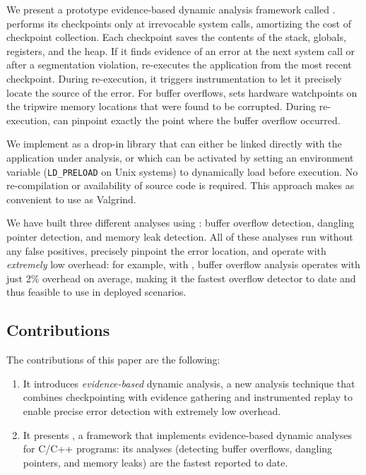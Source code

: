 We present a prototype evidence-based dynamic analysis framework called \doubletake{}. \doubletake{} performs its checkpoints only at
irrevocable system calls, amortizing the cost of checkpoint
collection. Each checkpoint saves the contents of the stack,
globals, registers, and the heap. If it finds evidence of an error at
the next system call or after a segmentation violation, \doubletake{}
re-executes the application from the most recent checkpoint. During
re-execution, it triggers instrumentation to let it precisely locate
the source of the error. For buffer overflows, \doubletake{} sets hardware watchpoints on the tripwire
memory locations that were found to be corrupted. During re-execution,
\doubletake{} can pinpoint exactly the point where the buffer overflow
occurred.

We implement \doubletake{} as a drop-in library that can either be
linked directly with the application under analysis, or which can be
activated by setting an environment variable (\texttt{LD\_PRELOAD} on
Unix systems) to dynamically load \doubletake{} before execution. No
re-compilation or availability of source code is required. This
approach makes \doubletake{} as convenient to use as Valgrind.

We have built three different analyses using \doubletake{}: buffer
overflow detection, dangling pointer detection, and memory leak
detection. All of these analyses run without any false positives,
precisely pinpoint the error location, and operate
with \emph{extremely} low overhead: for example, with \doubletake{},
buffer overflow analysis operates with just 2\% overhead on average,
making it the fastest overflow detector to date and thus feasible to
use in deployed scenarios.

\subsection*{Contributions}

The contributions of this paper are the following:

\begin{enumerate}

\item It introduces \emph{evidence-based} dynamic analysis, a new analysis technique that combines checkpointing with evidence gathering and instrumented replay to enable precise error detection with extremely low overhead.

\item It presents \doubletake{}, a framework that implements evidence-based dynamic analyses for C/C++ programs: its analyses (detecting buffer overflows, dangling pointers, and memory leaks) are the fastest reported to date.

\end{enumerate}


